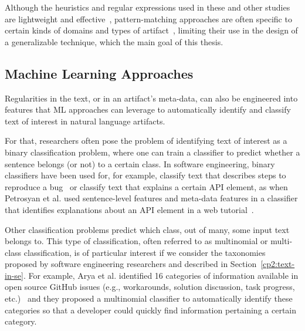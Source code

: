 Although the heuristics and regular expressions used in these and other studies~\cite{nadi2020, Maalej2013}
are lightweight and effective~\cite{Bavota2016}, 
pattern-matching approaches 
are often specific to certain kinds of domains and types of artifact~\cite{fucci2019}, 
limiting their use in the design of a generalizable technique, which the main goal of this thesis.







\subsection{Machine Learning Approaches}
\label{cp2:machine-learning}


Regularities in the text, or in an artifact's meta-data, can also be 
engineered into features that \acf{ML} 
approaches can leverage to automatically identify and classify
text of interest in natural language artifacts. 



For that, researchers often pose the problem of identifying text of interest 
as a binary classification problem, where
one can train a classifier
to predict whether a sentence belongs (or not)
to a certain class. 
In software engineering, 
binary classifiers have been used for,
for example, classify text that describes steps to reproduce a bug~\cite{Chaparro2016} or 
classify text that explains a certain API element, as when 
Petrosyan et al. used 
 sentence-level features
and meta-data features in a classifier 
that 
identifies explanations about an API element  in a web tutorial~\cite{Petrosyan2015}.




Other classification problems predict which class, out of many, some input text belongs to. 
This type of classification, often referred to as multinomial or multi-class classification, 
is of particular interest if 
we consider the taxonomies proposed by software engineering researchers 
and described in Section~\ref{cp2:text-in-se}.
For example, Arya et al. identified 16 categories of  information available
in open source GitHub issues (e.g., workarounds, solution discussion, task progress, etc.)~\cite{Arya2019}
and they proposed a multinomial classifier 
to automatically identify these categories
so that a developer could quickly find information pertaining a certain category. 








